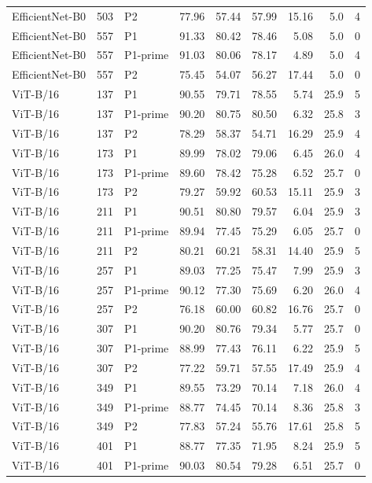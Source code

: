 {\begin{longtable}{lrlrrrrrr}
EfficientNet-B0 & 503 & P2 & 77.96 & 57.44 & 57.99 & 15.16 & 5.0 & 4 \\
EfficientNet-B0 & 557 & P1 & 91.33 & 80.42 & 78.46 & 5.08 & 5.0 & 0 \\
EfficientNet-B0 & 557 & P1-prime & 91.03 & 80.06 & 78.17 & 4.89 & 5.0 & 4 \\
EfficientNet-B0 & 557 & P2 & 75.45 & 54.07 & 56.27 & 17.44 & 5.0 & 0 \\
ViT-B/16 & 137 & P1 & 90.55 & 79.71 & 78.55 & 5.74 & 25.9 & 5 \\
ViT-B/16 & 137 & P1-prime & 90.20 & 80.75 & 80.50 & 6.32 & 25.8 & 3 \\
ViT-B/16 & 137 & P2 & 78.29 & 58.37 & 54.71 & 16.29 & 25.9 & 4 \\
ViT-B/16 & 173 & P1 & 89.99 & 78.02 & 79.06 & 6.45 & 26.0 & 4 \\
ViT-B/16 & 173 & P1-prime & 89.60 & 78.42 & 75.28 & 6.52 & 25.7 & 0 \\
ViT-B/16 & 173 & P2 & 79.27 & 59.92 & 60.53 & 15.11 & 25.9 & 3 \\
ViT-B/16 & 211 & P1 & 90.51 & 80.80 & 79.57 & 6.04 & 25.9 & 3 \\
ViT-B/16 & 211 & P1-prime & 89.94 & 77.45 & 75.29 & 6.05 & 25.7 & 0 \\
ViT-B/16 & 211 & P2 & 80.21 & 60.21 & 58.31 & 14.40 & 25.9 & 5 \\
ViT-B/16 & 257 & P1 & 89.03 & 77.25 & 75.47 & 7.99 & 25.9 & 3 \\
ViT-B/16 & 257 & P1-prime & 90.12 & 77.30 & 75.69 & 6.20 & 26.0 & 4 \\
ViT-B/16 & 257 & P2 & 76.18 & 60.00 & 60.82 & 16.76 & 25.7 & 0 \\
ViT-B/16 & 307 & P1 & 90.20 & 80.76 & 79.34 & 5.77 & 25.7 & 0 \\
ViT-B/16 & 307 & P1-prime & 88.99 & 77.43 & 76.11 & 6.22 & 25.9 & 5 \\
ViT-B/16 & 307 & P2 & 77.22 & 59.71 & 57.55 & 17.49 & 25.9 & 4 \\
ViT-B/16 & 349 & P1 & 89.55 & 73.29 & 70.14 & 7.18 & 26.0 & 4 \\
ViT-B/16 & 349 & P1-prime & 88.77 & 74.45 & 70.14 & 8.36 & 25.8 & 3 \\
ViT-B/16 & 349 & P2 & 77.83 & 57.24 & 55.76 & 17.61 & 25.8 & 5 \\
ViT-B/16 & 401 & P1 & 88.77 & 77.35 & 71.95 & 8.24 & 25.9 & 5 \\
ViT-B/16 & 401 & P1-prime & 90.03 & 80.54 & 79.28 & 6.51 & 25.7 & 0 \\

\end{longtable}}
